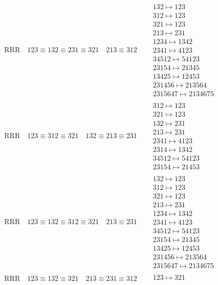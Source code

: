 \documentclass{article}
\begin{document}
\begin{align}
\\
\text{RRR}
\quad
123\equiv132\equiv231\equiv321
\quad
213\equiv312
\quad
&
\begin{matrix}
132 \mapsto 123
\\
312 \mapsto 123
\\
321 \mapsto 123
\\
213 \mapsto 231
\\
1234 \mapsto 1342
\\
2341 \mapsto 4123
\\
34512 \mapsto 54123
\\
23154 \mapsto 21345
\\
13425 \mapsto 12453
\\
231456 \mapsto 213564
\\
2315647 \mapsto 2134675
\end{matrix}
\\
\text{RRR}
\quad
123\equiv312\equiv321
\quad
132\equiv213\equiv231
\quad
&
\begin{matrix}
312 \mapsto 123
\\
321 \mapsto 123
\\
132 \mapsto 231
\\
213 \mapsto 231
\\
2341 \mapsto 4123
\\
2314 \mapsto 1342
\\
34512 \mapsto 54123
\\
23154 \mapsto 21453
\end{matrix}
\\
\text{RRR}
\quad
123\equiv132\equiv312\equiv321
\quad
213\equiv231
\quad
&
\begin{matrix}
132 \mapsto 123
\\
312 \mapsto 123
\\
321 \mapsto 123
\\
213 \mapsto 231
\\
1234 \mapsto 1342
\\
2341 \mapsto 4123
\\
34512 \mapsto 54123
\\
23154 \mapsto 21345
\\
13425 \mapsto 12453
\\
231456 \mapsto 213564
\\
2315647 \mapsto 2134675
\end{matrix}
\\
\text{RRR}
\quad
123\equiv132\equiv321
\quad
213\equiv231\equiv312
\quad
&
\begin{matrix}
123 \mapsto 321
\\

\end{matrix}
\end{align}
\end{document}
